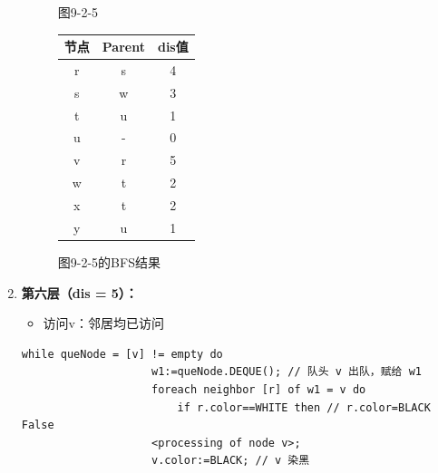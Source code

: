 \documentclass{article}
\begin{document}
\begin{enumerate}
\begin{figure}[htbp]
\begin{minipage}[b]{0.6\textwidth}
                \caption{图9-2-5}
                \label{fig:9-2-5}
        \end{minipage}%
        \hfill%
        \begin{minipage}[b]{0.4\textwidth}    %
            \centering
            \begin{tabular}{|c|c|c|}
                    \hline
                    节点 & Parent & dis值 \\
                    \hline
                    r & s & 4 \\
                    s & w & 3 \\
                    t & u & 1 \\
                    u & - & 0 \\
                    v & r & 5 \\
                    w & t & 2 \\
                    x & t & 2 \\
                    y & u & 1 \\
                    \hline
                \end{tabular}
                \caption{图9-2-5的BFS结果}
                \label{tab:graph9-2-5-bfs}
        \end{minipage}
    \end{figure}

    \pagebreak
    
    \item \textbf{第六层（dis = 5）：}
    
    \begin{itemize}
        \item 访问v：邻居均已访问
    \end{itemize}

    \begin{lstlisting}[style=algorithmPPT]
                while queNode = [v] != empty do 
                    w1:=queNode.DEQUE(); // 队头 v 出队，赋给 w1
                    foreach neighbor [r] of w1 = v do
                        if r.color==WHITE then // r.color=BLACK False
                    <processing of node v>;
                    v.color:=BLACK; // v 染黑
        \end{lstlisting}    


\end{enumerate}
\end{document}
